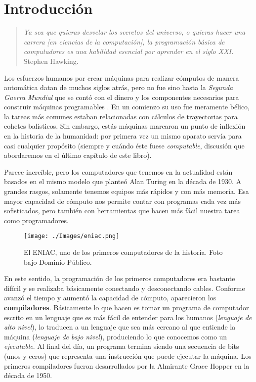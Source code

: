 \chapter{Introducción}

\begin{quote}
\emph{Ya sea que quieras desvelar los secretos del universo, o quieras hacer una carrera [en ciencias de la computación], la programación básica de computadores es una habilidad esencial por aprender en el siglo XXI.} \\
Stephen Hawking.
\end{quote}

Los esfuerzos humanos por crear máquinas para realizar cómputos de manera automática datan de muchos siglos atrás, pero no fue sino hasta la \emph{Segunda Guerra Mundial} que se contó con el dinero y los componentes necesarios para construir máquinas programables \cite[p.~108]{evansIntro}. En un comienzo su uso fue meramente bélico, la tareas más comunes estaban relacionadas con cálculos de trayectorias para cohetes balísticos. Sin embargo, estás máquinas marcaron un punto de inflexión en la historia de la humanidad: por primera vez un mismo aparato servía para casi cualquier propósito (siempre y cuándo éste fuese \emph{computable}, discusión que abordaremos en el último capítulo de este libro).

Parece increíble, pero los computadores que tenemos en la actualidad están basados en el mismo modelo que planteó Alan Turing en la década de 1930. A grandes rasgos, solamente tenemos equipos más rápidos y con más memoria. Esa mayor capacidad de cómputo nos permite contar con programas cada vez más sofisticados, pero también con herramientas que hacen más fácil nuestra tarea como programadores.
 \newpage

\begin{wrapfigure}{r}{0.5\textwidth}
	\begin{center}
	\texttt{[image: ./Images/eniac.png]}
	\end{center}	
	\caption{El ENIAC, uno de los primeros computadores de la historia. Foto bajo  Dominio Público.}
\end{wrapfigure}

En este sentido, la programación de los primeros computadores era bastante difícil y se realizaba básicamente conectando y desconectando cables. Conforme avanzó el tiempo y aumentó la capacidad de cómputo, aparecieron los \textbf{compiladores}. Básicamente lo que hacen es tomar un programa de computador escrito en un lenguaje que es más fácil de entender para los humanos (\emph{lenguaje de alto nivel}), lo traducen a un lenguaje que sea más cercano al que entiende la máquina (\emph{lenguaje de bajo nivel}), produciendo lo que conocemos como un \emph{ejecutable}. Al final del día, un programa termina siendo una secuencia de bits (unos y ceros) que representa una instrucción que puede ejecutar la máquina. Los primeros compiladores fueron desarrollados por la Almirante Grace Hopper en la década de 1950.

